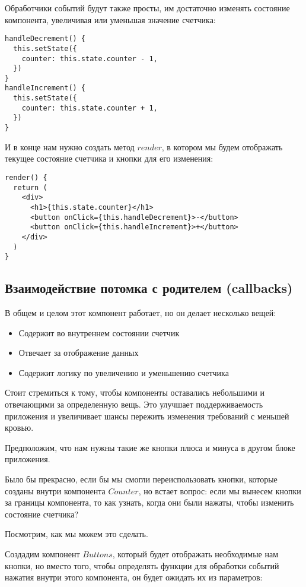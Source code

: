 Обработчики событий будут также просты, им достаточно изменять состояние компонента, увеличивая или уменьшая значение счетчика:

\begin{lstlisting}
handleDecrement() {
  this.setState({
    counter: this.state.counter - 1,
  })
}
handleIncrement() {
  this.setState({
    counter: this.state.counter + 1,
  })
}
\end{lstlisting}

И в конце нам нужно создать метод $render$, в котором мы будем отображать текущее состояние счетчика и кнопки для его изменения:

\begin{lstlisting}
render() {
  return (
    <div>
      <h1>{this.state.counter}</h1>
      <button onClick={this.handleDecrement}>-</button>
      <button onClick={this.handleIncrement}>+</button>
    </div> 
  )
}
\end{lstlisting}

\subsection*{Взаимодействие потомка с родителем (callbacks)}

В общем и целом этот компонент работает, но он делает несколько вещей:

\begin{itemize}
  \item Содержит во внутреннем состоянии счетчик
  \item Отвечает за отображение данных
  \item Содержит логику по увеличению и уменьшению счетчика
\end{itemize}

Стоит стремиться к тому, чтобы компоненты оставались небольшими и отвечающими за определенную вещь. Это улучшает поддерживаемость приложения и увеличивает шансы пережить изменения требований с меньшей кровью.

Предположим, что нам нужны такие же кнопки плюса и минуса в другом блоке приложения.

Было бы прекрасно, если бы мы смогли переиспользовать кнопки, которые созданы внутри компонента $Counter$, но встает вопрос: если мы вынесем кнопки за границы компонента, то как узнать, когда они были нажаты, чтобы изменить состояние счетчика?

Посмотрим, как мы можем это сделать.

Создадим компонент $Buttons$, который будет отображать необходимые нам кнопки, но вместо того, чтобы определять функции для обработки событий нажатия внутри этого компонента, он будет ожидать их из параметров:

